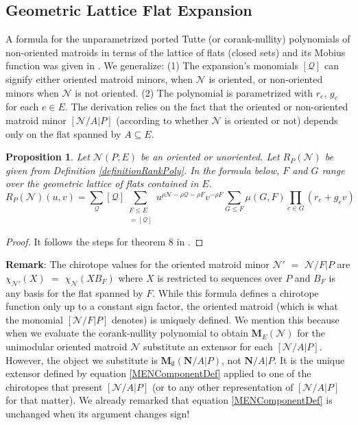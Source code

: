 \documentclass[12pt]{article}
\newtheorem{proposition}[theorem]{Proposition}
\theoremstyle{definition}
\newcommand{\Remark}{\textbf{Remark}}
\newcommand{\rank}{{\rho}}%
\newcommand{\ext}[1]{\ensuremath{\mathbf{#1}}}
\begin{document}
\subsection{Geometric Lattice Flat Expansion}

A formula for the unparametrized ported Tutte (or corank-nullity) 
polynomials
of non-oriented matroids in terms of the lattice of flats (closed sets)
and its Mobius function was given in \cite{sdcPorted}.  
We generalize: (1) The expansion's
monomials $[\mathcal{Q}]$ can signify either oriented matroid minors,
when $\mathcal{N}$ is oriented, or non-oriented minors
when $\mathcal{N}$ is not oriented.  (2) The polynomial is parametrized
with $r_e$, $g_e$ for each $e\in E$.
The derivation relies on the
fact that the oriented or non-oriented matroid minor $[\mathcal{N}/A|P]$
(according to whether $\mathcal{N}$ is oriented or not) depends
only on the flat spanned by $A\subseteq E$.  

\begin{proposition}
Let $\mathcal{N}(P,E)$ be an oriented or unoriented.
Let $R_P(\mathcal{N})$ be given from Definition 
\ref{definitionRankPoly}.
In the formula below,
$F$ and $G$ range over the geometric lattice of flats contained
in $E$.
\begin{equation}
R_P(\mathcal{N})(u,v) = \sum_{\mathcal{Q}}[\mathcal{Q}]
      \sum_{\substack{F\leq E\\
                     [\mathcal{N}/F|P]=[\mathcal{Q}]
           }}
                   u^{\rank{\mathcal{N}}-\rank{\mathcal{Q}}-\rank{F}}
                   v^{-\rank{F}}
                   \sum_{G\le F}
                   \mu(G,F)
                   \prod_{e\in G}
                    (r_e+g_ev)
\end{equation}
\end{proposition}

\begin{proof}
It follows the steps for theorem 8 in \cite{sdcPorted}.
\end{proof}

\Remark: The chirotope values for the oriented matroid minor
$\mathcal{N}'$ $=$ $\mathcal{N}/ F|P$ are
$\chi_{\mathcal{N}'}(X)$
$=$ $\chi_{\mathcal{N}}(XB_F)$ where $X$ is restricted to sequences
over $P$ and 
$B_F$ is any basis for the flat spanned by $F$.
While this formula
defines a chirotope function 
only up to a constant sign factor, the oriented matroid (which is what
the monomial $[\mathcal{N}/F|P]$ denotes) is uniquely defined.  We mention
this because when we evaluate the corank-nullity polynomial to obtain
$\ext{M}_E(\mathcal{N})$ for the unimodular oriented matroid 
$\mathcal{N}$
substitute an extensor 
for each $[\mathcal{N}/A|P]$.  
However, the object we
substitute is $\ext{M}_\emptyset(\ext{N}/A|P)$,
not $\ext{N}/A|P$.  It is the unique extensor defined by equation 
\eqref{MENComponentDef} applied to one of the chirotopes
that present $[\mathcal{N}/A|P]$ (or to any other representation
of $[\mathcal{N}/A|P]$ for that matter).  We already remarked that equation 
\eqref{MENComponentDef} is unchanged
when its argument changes sign!
\end{document}
